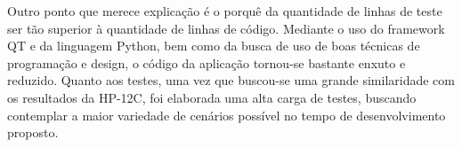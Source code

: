Outro ponto que merece explicação é o porquê da quantidade de linhas de teste ser tão superior à quantidade de linhas de código. Mediante o uso do framework QT e da linguagem Python, bem como da busca de uso de boas técnicas de programação e design, o código da aplicação tornou-se bastante enxuto e reduzido. Quanto aos testes, uma vez que buscou-se uma grande similaridade com os resultados da HP-12C, foi elaborada uma alta carga de testes, buscando contemplar a maior variedade de cenários possível no tempo de desenvolvimento proposto.